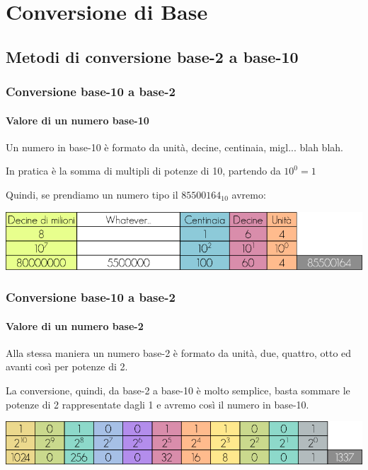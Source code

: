 \documentclass{beamer}
\begin{document}
  \section[Conversion]{Conversione di Base}
  \subsection{Metodi di conversione base-2 a base-10}
  \begin{frame}
  		\frametitle{Conversione base-10 a base-2}
    \framesubtitle{Valore di un numero base-10}
  		Un numero in base-10 è formato da unità, decine, centinaia, migl... blah blah.
  		
  		In pratica è la somma di multipli di potenze di 10, partendo da $10^0 = 1$
  		
  		Quindi, se prendiamo un numero tipo il $85500164_{10}$ avremo:
  		
  		\vspace{2em}
  		\includegraphics[width=\textwidth]{IMGs/base-10read.png}
    
  \end{frame}
  \begin{frame}
  		\frametitle{Conversione base-10 a base-2}
    \framesubtitle{Valore di un numero base-2}
  		Alla stessa maniera un numero base-2 è formato da unità, due, quattro, otto ed avanti così
  		per potenze di 2.
		
		La conversione, quindi, da base-2 a base-10 è molto semplice, basta sommare le
		potenze di 2 rappresentate dagli 1 e avremo così il numero in base-10.  		
  		
  		\vspace{2em}
  		\includegraphics[width=\textwidth]{IMGs/base-2read.png}
    
  \end{frame}
\end{document}
